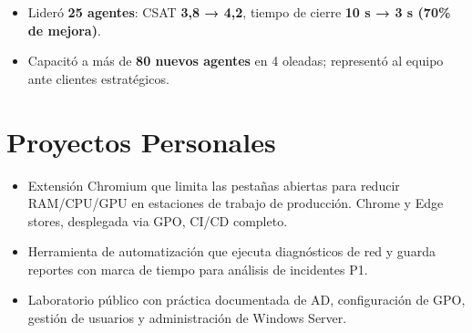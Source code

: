 \documentclass[10pt]{article}
\begin{document}
\vspace{3pt}

\begin{itemize}
  \item Lideró \textbf{25 agentes}: CSAT \textbf{3,8 → 4,2}, tiempo de cierre \textbf{10 s → 3 s
        (70\% de mejora)}.
  \item Capacitó a más de \textbf{80 nuevos agentes} en 4 oleadas; representó al equipo ante
        clientes estratégicos.
\end{itemize}

\section{Proyectos Personales}

\begin{itemize}
  \item Extensión Chromium que limita las pestañas abiertas para reducir RAM/CPU/GPU en
        estaciones de trabajo de producción. Chrome y Edge stores, desplegada via GPO, CI/CD completo.
\end{itemize}

\vspace{3pt}

\begin{itemize}
  \item Herramienta de automatización que ejecuta diagnósticos de red y guarda reportes con
        marca de tiempo para análisis de incidentes P1.
\end{itemize}

\vspace{3pt}

\begin{itemize}
  \item Laboratorio público con práctica documentada de AD, configuración de GPO, gestión
        de usuarios y administración de Windows Server.
\end{itemize}

\end{document}
